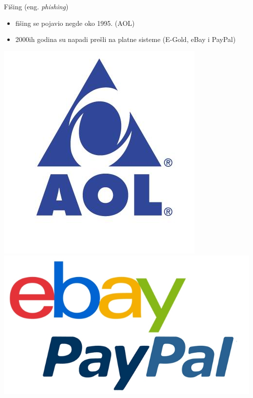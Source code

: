     \begin{frame}{Fišing (eng. \textit{phishing})}
        \begin{minipage}{0.6\textwidth}
        \begin{itemize}
                \item fišing se pojavio negde oko 1995. (AOL)
                \item 2000ih godina su napadi prešli na platne sisteme (E-Gold, eBay i PayPal)
            \end{itemize}
        \end{minipage}
        \begin{minipage}[t]{0.3\linewidth}
            \centering
            \includegraphics[scale = 0.045]{images/aol_logo.jpg}
            \hspace{0.1cm}
            \includegraphics[scale = 0.05]{images/PayPal_eBay.jpg}
        \end{minipage}
        

\end{frame}
